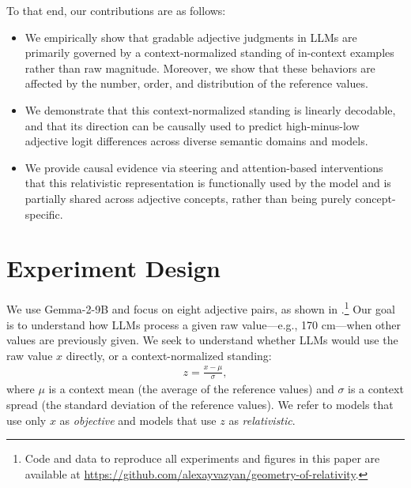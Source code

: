 \documentclass{article}
\begin{document}
To that end, our contributions are as follows:
\begin{itemize}
    \item We empirically show that gradable adjective judgments in LLMs are primarily governed by a context-normalized standing of in-context examples rather than raw magnitude. Moreover, we show that these behaviors are affected by the number, order, and distribution of the reference values.
    
    \item We demonstrate that this context-normalized standing is linearly decodable, and that its direction can be causally used to predict high-minus-low adjective logit differences across diverse semantic domains and models.

    \item We provide causal evidence via steering and attention-based interventions that this relativistic representation is functionally used by the model and is partially shared across adjective concepts, rather than being purely concept-specific.
\end{itemize}

\section{Experiment Design}
\label{sec:experiment_design}
We use Gemma-2-9B \citep{gemma2_2024} and focus on eight adjective pairs, as shown in .\footnote{Code and data to reproduce all experiments and figures in this paper are available at \url{https://github.com/alexayvazyan/geometry-of-relativity}.}
Our goal is to understand how LLMs process a given raw value---e.g., 170 cm---when other values are previously given.
We seek to understand whether LLMs would use the raw value $x$ directly, or a context-normalized standing:
\begin{align*}
    z = \frac{x-\mu}{\sigma},
\end{align*}
where $\mu$ is a context mean (the average of the reference values) and $\sigma$ is a context spread (the standard deviation of the reference values).
We refer to models that use only $x$ as \emph{objective} and models that use $z$ as \emph{relativistic}.
\end{document}
